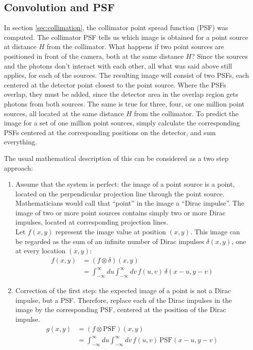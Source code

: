\documentclass[11pt,oneside]{article}
\begin{document}
\newpage
\subsection{Convolution and PSF} \label{app:convolution}
In section \ref{sec:collimation}, the collimator point spread function (PSF)
was computed. The collimator PSF tells us which image is obtained for a point
source at distance $H$ from the collimator. What happens if two point sources
are positioned in front of the camera, both at the same distance $H$? Since
the sources and the photons don't interact with each other, all what was said
above still applies, for each of the sources. The resulting image will consist
of two PSFs, each centered at the detector point closest to the point
source. Where the PSFs overlap, they must be added, since the detector area
in the overlap region gets photons from both sources. The same is true for
three, four, or one million point sources, all located at the same distance
$H$ from the collimator. To predict the image for a set of one million point
sources, simply calculate the corresponding PSFs centered at the
corresponding positions on the detector, and sum everything.

The usual mathematical description of this can be considered as a two step
approach:
\begin{enumerate}
\item
Assume that the system is perfect: the image of a point source is a point,
located on the perpendicular projection line through the point source.
Mathematicians would call that ``point'' in the image a ``Dirac impulse''.
The image of two or more point sources contains simply two or more Dirac
impulses, located at corresponding projection lines.\\
%
Let $f(x,y)$ represent the image value at position $(x,y)$. This image
can be regarded as the sum of an infinite number of Dirac impulses
$\delta(x,y)$, one at every location $(x,y)$:
\begin{align}
f(x,y) &= (f \otimes \delta) (x,y)\\
       &= \int_{-\infty}^{\infty} du \int_{-\infty}^{\infty} dv \, f(u,v) \, \delta(x-u, y-v)
\end{align}

\item
Correction of the first step: the expected image of a point is not a Dirac
impulse, but a PSF. Therefore, replace each of the Dirac impulses in the image
by the corresponding PSF, centered at the position of the Dirac impulse.
\begin{align}
g(x,y) &= (f \otimes \mbox{PSF}) (x,y)\\
       &= \int_{-\infty}^{\infty} du \int_{-\infty}^{\infty} dv \, f(u,v) \, \mbox{PSF}(x-u, y-v)
\end{align}
\end{enumerate}
\end{document}
